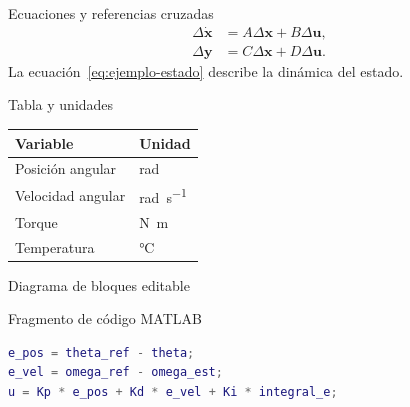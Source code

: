 \documentclass{beamer}
\begin{document}
\begin{frame}{Ecuaciones y referencias cruzadas}
  \begin{align}
    \Delta\dot{\mathbf{x}} &= A\Delta\mathbf{x} + B\Delta\mathbf{u},
      \label{eq:ejemplo-estado}\\
    \Delta\mathbf{y} &= C\Delta\mathbf{x} + D\Delta\mathbf{u}.
  \end{align}
  La ecuación~\eqref{eq:ejemplo-estado} describe la dinámica del estado.
\end{frame}

\begin{frame}{Tabla y unidades}
  \centering
  \begin{tabular}{@{}ll@{}}
    \toprule
    Variable & Unidad \\
    \midrule
    Posición angular & \unit{\radian} \\
    Velocidad angular & \unit{\radian\per\second} \\
    Torque & \unit{\newton\metre} \\
    Temperatura & \unit{\degreeCelsius} \\
    \bottomrule
  \end{tabular}

\end{frame}

\begin{frame}{Diagrama de bloques editable}
  \centering
\end{frame}

\begin{frame}[fragile]{Fragmento de código MATLAB}
  \begin{lstlisting}[language=Matlab,basicstyle=\ttfamily\small,columns=fullflexible,breaklines=true]
e_pos = theta_ref - theta;
e_vel = omega_ref - omega_est;
u = Kp * e_pos + Kd * e_vel + Ki * integral_e;
  \end{lstlisting}
\end{frame}
\end{document}
